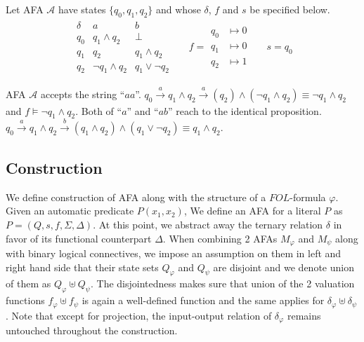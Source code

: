 \begin{example}
Let AFA \( \mathcal{A} \) have 
states \( \{q_0, q_1, q_2\} \) and whose \( \delta \), \( f \) and \(
s \) be specified below.
\begin{align*}
  \begin{array}{c|cc}
    \delta & a & b \\\hline
    q_0 & q_1 \wedge q_2      & \bot           \\
    q_1 & q_2                 & q_1 \wedge q_2 \\
    q_2 & \neg q_1 \wedge q_2 & q_1 \vee \neg q_2
  \end{array}&& f = \begin{smallmatrix}q_0 &\mapsto 0\\q_1 &\mapsto 0\\q_2 &\mapsto 1\end{smallmatrix} && s = q_0
\end{align*}

AFA \( \mathcal{A} \) accepts the string ``\( aa \)''. \(q_0
\xrightarrow[]a q_1 \wedge q_2 \xrightarrow[]a (q_2)
\wedge (\neg q_1 \wedge q_2) \equiv \neg q_1 \wedge q_2 \) and \( f \models \neg
q_1 \wedge q_2 \). Both of ``\(a\)'' and ``\( ab \)'' reach to the identical proposition. \(q_0
\xrightarrow[]a q_1 \wedge q_2 \xrightarrow[]b (q_1 \wedge q_2)
\wedge (q_1 \vee \neg q_2) \equiv q_1 \wedge q_2 \).

\end{example}

\subsection{Construction}

We define construction of AFA along with the structure of a \( \mathit{FOL}
\)-formula \( \varphi \). Given an automatic predicate \( P(x_1, x_2) \), We
define an AFA for a literal \( P \) as \( P = (Q, s, f, \Sigma, \Delta) \). At
this point, we abstract away the ternary relation \( \delta \) in favor of its
functional counterpart \( \Delta \). When combining 2 AFAs \( \mathit{M}_\varphi
\) and \( \mathit{M}_\psi \) along with binary logical connectives, we impose an
assumption on them in left and right hand side that their state sets \(
Q_\varphi \) and \( Q_\psi \) are disjoint and we denote union of them as \(
Q_\varphi \uplus Q_\psi \).  The disjointedness makes sure that union of the 2
valuation functions \( f_\varphi \uplus f_\psi \) is again a well-defined
function and the same applies for \( \delta_\varphi \uplus \delta_\psi \). Note
that except for projection, the input-output relation of \( \delta_{\varphi} \)
remains untouched throughout the construction.


